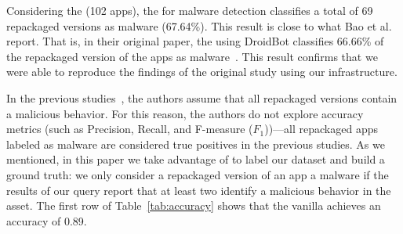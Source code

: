 
Considering the \sds (102 apps), the \mas for malware detection 
classifies a total of 69 repackaged versions as malware (67.64\%).
This result is close to what Bao et al. report. That is, in their
original paper,  the \mas using DroidBot classifies 66.66\% of the
repackaged version of the apps as malware~\cite{DBLP:conf/wcre/BaoLL18}.
This result confirms that we were able to reproduce
the findings of the original study using our
infrastructure. 


In the previous studies~\cite{DBLP:conf/wcre/BaoLL18,DBLP:journals/jss/CostaMMSSBNR22},
the authors assume that all repackaged versions contain a
malicious behavior. For this reason, the authors do not
explore accuracy metrics (such as Precision, Recall, and
F-measure ($F_1$))---all repackaged apps labeled as
malware are considered true positives in the previous studies.
As we mentioned, in this paper we take advantage
of \vt to label our dataset and build a ground truth: we only
consider a repackaged version of an app a malware if the results
of our \vt query report that at least two
\ses identify a malicious behavior in the asset. %
The first row of Table~\ref{tab:accuracy} shows that the
vanilla \mas achieves an accuracy of 0.89. 

\begin{table}[htb]
  \caption{Accuracy of the \mas in both datasets.}
  \label{tab:accuracy}
\end{table}

